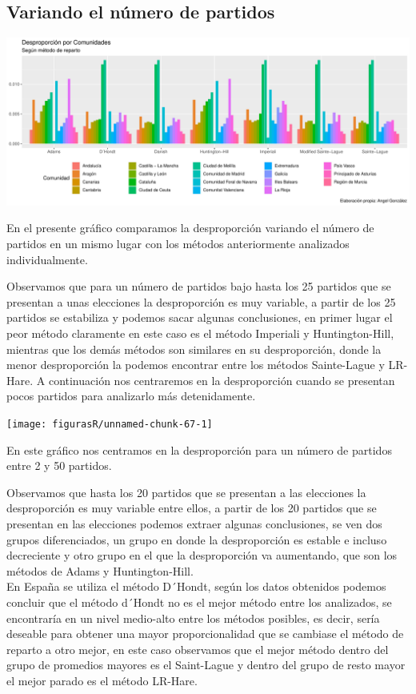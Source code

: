 \documentclass[12pt,a4paper,]{book}
\numberwithin{dummy}{section}
\theoremstyle{ocrenumbox}
\theoremstyle{blacknumex}
\theoremstyle{blacknumbox}
\theoremstyle{ocrenum}
\theoremstyle{ocrenum}
\begin{document}
\hypertarget{variando-el-nuxfamero-de-partidos}{%
\subsection{Variando el número de
partidos}\label{variando-el-nuxfamero-de-partidos}}

\begin{center}\includegraphics[width=0.95\linewidth]{figurasR/unnamed-chunk-66-1} \end{center}

En el presente gráfico comparamos la desproporción variando el número de
partidos en un mismo lugar con los métodos anteriormente analizados
individualmente.

Observamos que para un número de partidos bajo hasta los 25 partidos que
se presentan a unas elecciones la desproporción es muy variable, a
partir de los 25 partidos se estabiliza y podemos sacar algunas
conclusiones, en primer lugar el peor método claramente en este caso es
el método Imperiali y Huntington-Hill, mientras que los demás métodos
son similares en su desproporción, donde la menor desproporción la
podemos encontrar entre los métodos Sainte-Lague y LR-Hare. A
continuación nos centraremos en la desproporción cuando se presentan
pocos partidos para analizarlo más detenidamente.

\begin{center}\texttt{[image: figurasR/unnamed-chunk-67-1]} \end{center}

En este gráfico nos centramos en la desproporción para un número de
partidos entre 2 y 50 partidos.

Observamos que hasta los 20 partidos que se presentan a las elecciones
la desproporción es muy variable entre ellos, a partir de los 20
partidos que se presentan en las elecciones podemos extraer algunas
conclusiones, se ven dos grupos diferenciados, un grupo en donde la
desproporción es estable e incluso decreciente y otro grupo en el que la
desproporción va aumentando, que son los métodos de Adams y
Huntington-Hill.\\
En España se utiliza el método D´Hondt, según los datos obtenidos
podemos concluir que el método d´Hondt no es el mejor método entre los
analizados, se encontraría en un nivel medio-alto entre los métodos
posibles, es decir, sería deseable para obtener una mayor
proporcionalidad que se cambiase el método de reparto a otro mejor, en
este caso observamos que el mejor método dentro del grupo de promedios
mayores es el Saint-Lague y dentro del grupo de resto mayor el mejor
parado es el método LR-Hare.
\end{document}
